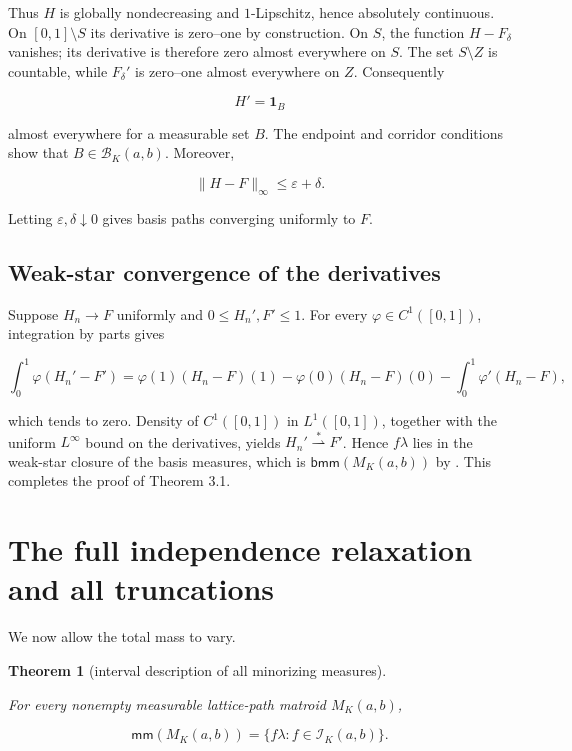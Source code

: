 \documentclass[11pt]{article}
\newtheorem{theorem}{Theorem}[section]
\numberwithin{equation}{section}
\begin{document}
Thus $H$ is globally nondecreasing and $1$-Lipschitz, hence absolutely continuous.
On $[0,1]\setminus S$ its derivative is zero--one by construction. On $S$, the
function $H-F_\delta$ vanishes; its derivative is therefore zero almost everywhere on
$S$. The set $S\setminus Z$ is countable, while $F_\delta'$ is zero--one almost
everywhere on $Z$. Consequently

\nopagebreak[4]
\[
H'=\mathbf 1_B
\]

almost everywhere for a measurable set $B$. The endpoint and corridor conditions show
that $B\in\mathcal B_K(a,b)$. Moreover,

\nopagebreak[4]
\[
\|H-F\|_\infty\le\varepsilon+\delta.
\]

Letting $\varepsilon,\delta\downarrow0$ gives basis paths converging uniformly to $F$.

\subsection{Weak-star convergence of the derivatives}


Suppose $H_n\to F$ uniformly and $0\le H_n',F'\le1$. For every
$\varphi\in C^1([0,1])$, integration by parts gives

\nopagebreak[4]
\[
\int_0^1\varphi(H_n'-F')
=\varphi(1)(H_n-F)(1)-\varphi(0)(H_n-F)(0)
-\int_0^1\varphi'(H_n-F),
\]

which tends to zero. Density of $C^1([0,1])$ in $L^1([0,1])$, together with the
uniform $L^\infty$ bound on the derivatives, yields $H_n'\overset{*}{\rightharpoonup}F'$.
Hence $f\lambda$ lies in the weak-star closure of the basis measures, which is
$\mathsf{bmm}(M_K(a,b))$ by \cite{berczi2026}. This completes the proof of Theorem 3.1.
\hfill\qedsymbol


\section{The full independence relaxation and all truncations}


We now allow the total mass to vary.

\begin{theorem}[interval description of all minorizing measures]
\label{thm:minorizing-interval}

For every nonempty measurable lattice-path matroid $M_K(a,b)$,

\nopagebreak[4]
\[
\mathsf{mm}(M_K(a,b))
=\{f\lambda:f\in\mathcal I_K(a,b)\}.
\]

\end{theorem}
\end{document}
